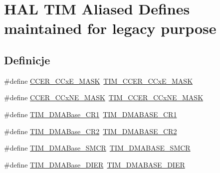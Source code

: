 \hypertarget{group___h_a_l___t_i_m___aliased___defines}{}\section{H\+AL T\+IM Aliased Defines maintained for legacy purpose}
\label{group___h_a_l___t_i_m___aliased___defines}
\subsection*{Definicje}
\begin{DoxyCompactItemize}
\item 
\#define \hyperlink{group___h_a_l___t_i_m___aliased___defines_ga679b7f970f7ad7001de9d6f7b211d667}{C\+C\+E\+R\+\_\+\+C\+Cx\+E\+\_\+\+M\+A\+SK}~\hyperlink{group___t_i_m___private___constants_ga5d1a1d755cda12637dfa5143130b4891}{T\+I\+M\+\_\+\+C\+C\+E\+R\+\_\+\+C\+Cx\+E\+\_\+\+M\+A\+SK}
\item 
\#define \hyperlink{group___h_a_l___t_i_m___aliased___defines_gadf1ac288d53d93679c086f9179dea88b}{C\+C\+E\+R\+\_\+\+C\+Cx\+N\+E\+\_\+\+M\+A\+SK}~\hyperlink{group___t_i_m___private___constants_gaeae61652a005098f9fe6b398d29d4279}{T\+I\+M\+\_\+\+C\+C\+E\+R\+\_\+\+C\+Cx\+N\+E\+\_\+\+M\+A\+SK}
\item 
\#define \hyperlink{group___h_a_l___t_i_m___aliased___defines_ga73bca5b14da2d5026fa3877d0db53740}{T\+I\+M\+\_\+\+D\+M\+A\+Base\+\_\+\+C\+R1}~\hyperlink{group___t_i_m___d_m_a___base__address_ga97bbe74e5ae8680c020a6b0f760d8909}{T\+I\+M\+\_\+\+D\+M\+A\+B\+A\+S\+E\+\_\+\+C\+R1}
\item 
\#define \hyperlink{group___h_a_l___t_i_m___aliased___defines_ga50e894f0d2cecc1ff3a3578098c3246e}{T\+I\+M\+\_\+\+D\+M\+A\+Base\+\_\+\+C\+R2}~\hyperlink{group___t_i_m___d_m_a___base__address_ga53d60ce92015bb60d608e60c45b1fdda}{T\+I\+M\+\_\+\+D\+M\+A\+B\+A\+S\+E\+\_\+\+C\+R2}
\item 
\#define \hyperlink{group___h_a_l___t_i_m___aliased___defines_ga748e24ac0675caa55869d6ba506448df}{T\+I\+M\+\_\+\+D\+M\+A\+Base\+\_\+\+S\+M\+CR}~\hyperlink{group___t_i_m___d_m_a___base__address_ga184ad86a4c6d48263f57d3e7106675c4}{T\+I\+M\+\_\+\+D\+M\+A\+B\+A\+S\+E\+\_\+\+S\+M\+CR}
\item 
\#define \hyperlink{group___h_a_l___t_i_m___aliased___defines_gaeddacbbc2adf9705feac250f077d8c93}{T\+I\+M\+\_\+\+D\+M\+A\+Base\+\_\+\+D\+I\+ER}~\hyperlink{group___t_i_m___d_m_a___base__address_ga137d2e3858ae68333646fea6e04503da}{T\+I\+M\+\_\+\+D\+M\+A\+B\+A\+S\+E\+\_\+\+D\+I\+ER}

\end{DoxyCompactItemize}
